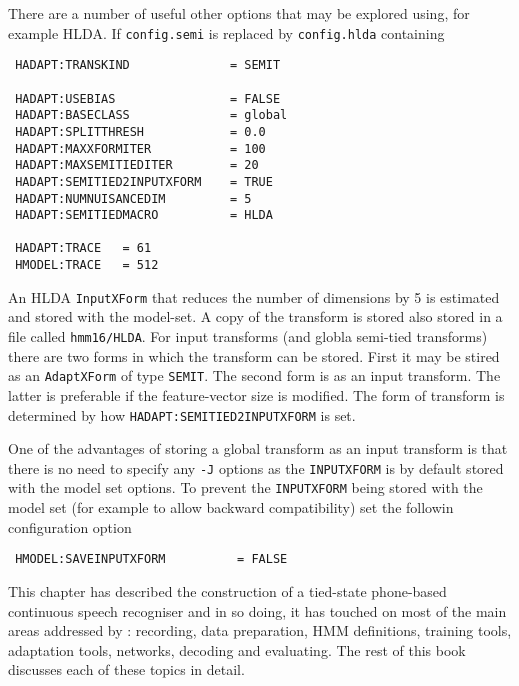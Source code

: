There are a number of useful other options that may be explored using, for example
HLDA. If \texttt{config.semi} is replaced by \texttt{config.hlda} containing
\begin{verbatim}
 HADAPT:TRANSKIND              = SEMIT

 HADAPT:USEBIAS                = FALSE
 HADAPT:BASECLASS              = global
 HADAPT:SPLITTHRESH            = 0.0
 HADAPT:MAXXFORMITER           = 100
 HADAPT:MAXSEMITIEDITER        = 20
 HADAPT:SEMITIED2INPUTXFORM    = TRUE
 HADAPT:NUMNUISANCEDIM         = 5
 HADAPT:SEMITIEDMACRO          = HLDA

 HADAPT:TRACE   = 61
 HMODEL:TRACE   = 512
\end{verbatim}
An HLDA \texttt{InputXForm} that reduces the number of dimensions by 5 is estimated
and stored with the model-set. A copy of the transform is stored also stored in 
a file called \texttt{hmm16/HLDA}. For input transforms (and globla semi-tied transforms)
there are two forms in which the transform can be stored. First it may be stired as
an \texttt{AdaptXForm} of type \texttt{SEMIT}. The second form is as an input transform.
The latter is preferable if the feature-vector size is modified. The form of transform
is determined by how \texttt{HADAPT:SEMITIED2INPUTXFORM} is set. 

One of the advantages of storing a global transform as an input transform is that there
is no need to specify any {\tt -J} options as the {\tt INPUTXFORM} is by default
stored with the model set options. To prevent the {\tt INPUTXFORM} being stored
with the model set (for example to allow backward compatibility) set the 
followin configuration option
\begin{verbatim}
 HMODEL:SAVEINPUTXFORM          = FALSE
\end{verbatim}

This chapter has described the construction of a tied-state phone-based
continuous speech recogniser and in so doing, it has touched on most of the
main areas addressed by \HTK: recording, data preparation, HMM definitions,
training tools, adaptation tools, networks, decoding and evaluating.  The 
rest of this book discusses each of these topics in detail.




